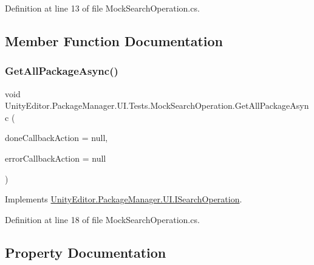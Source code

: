 Definition at line 13 of file Mock\+Search\+Operation.\+cs.



\subsection{Member Function Documentation}
\mbox{\label{class_unity_editor_1_1_package_manager_1_1_u_i_1_1_tests_1_1_mock_search_operation_add03cecd70ccc2ab64efe6787c5333a6}} 
\subsubsection{\texorpdfstring{GetAllPackageAsync()}{GetAllPackageAsync()}}
{\footnotesize\ttfamily void Unity\+Editor.\+Package\+Manager.\+U\+I.\+Tests.\+Mock\+Search\+Operation.\+Get\+All\+Package\+Async (\begin{DoxyParamCaption}\item[{Action$<$ I\+Enumerable$<$ \mbox{\hyperlink{class_unity_editor_1_1_package_manager_1_1_u_i_1_1_package_info}{Package\+Info}} $>$$>$}]{done\+Callback\+Action = {\ttfamily null},  }\item[{Action$<$ Error $>$}]{error\+Callback\+Action = {\ttfamily null} }\end{DoxyParamCaption})}



Implements \mbox{\hyperlink{interface_unity_editor_1_1_package_manager_1_1_u_i_1_1_i_search_operation_af96c1798a1e3b84d88c4da64dcb1f05d}{Unity\+Editor.\+Package\+Manager.\+U\+I.\+I\+Search\+Operation}}.



Definition at line 18 of file Mock\+Search\+Operation.\+cs.



\subsection{Property Documentation}
\mbox{\label{class_unity_editor_1_1_package_manager_1_1_u_i_1_1_tests_1_1_mock_search_operation_a1e671eae830da11be4dd524642a966ee}} 
